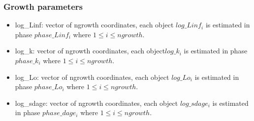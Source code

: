 \documentclass{article}
\begin{document}
\subsubsection{Growth parameters}
\begin{itemize}
    \item log\_Linf: vector of ngrowth coordinates, each object $log\_Linf_i$ is estimated in phase $phase\_Linf_i$ where $1\leq i \leq ngrowth$. 
    
    \item log\_k: vector of ngrowth coordinates, each object$log\_k_i$ is estimated in phase $phase\_k_i$ where $1\leq i \leq ngrowth$.
    
    \item log\_Lo: vector of ngrowth coordinates, each object $log\_Lo_i$ is estimated in phase $phase\_Lo_i$ where $1 \leq i \leq ngrowth$.
    
    \item log\_sdage: vector of ngrowth coordinates, each object $log\_sdage_i$ is estimated in phase $phase\_dage_i$ where $1 \leq i \leq ngrowth$.
    
    \end{itemize}
\end{document}
